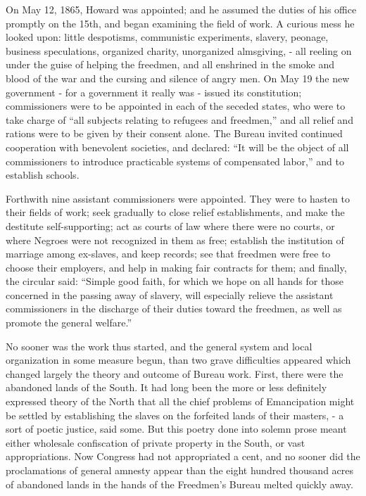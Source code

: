 On May 12, 1865, Howard was appointed; and he assumed the duties of his office promptly on the 15th, and began examining the field of work. A curious mess he looked upon: little despotisms, communistic experiments, slavery, peonage, business speculations, organized charity, unorganized almsgiving, - all reeling on under the guise of helping the freedmen, and all enshrined in the smoke and blood of the war and the cursing and silence of angry men. On May 19 the new government - for a government it really was - issued its constitution; commissioners were to be appointed in each of the seceded states, who were to take charge of “all subjects relating to refugees and freedmen,” and all relief and rations were to be given by their consent alone. The Bureau invited continued cooperation with benevolent societies, and declared: “It will be the object of all commissioners to introduce practicable systems of compensated labor,” and to establish schools.\par

Forthwith nine assistant commissioners were appointed. They were to hasten to their fields of work; seek gradually to close relief establishments, and make the destitute self-supporting; act as courts of law where there were no courts, or where Negroes were not recognized in them as free; establish the institution of marriage among ex-slaves, and keep records; see that freedmen were free to choose their employers, and help in making fair contracts for them; and finally, the circular said: “Simple good faith, for which we hope on all hands for those concerned in the passing away of slavery, will especially relieve the assistant commissioners in the discharge of their duties toward the freedmen, as well as promote the general welfare.”\par

No sooner was the work thus started, and the general system and local organization in some measure begun, than two grave difficulties appeared which changed largely the theory and outcome of Bureau work. First, there were the abandoned lands of the South. It had long been the more or less definitely expressed theory of the North that all the chief problems of Emancipation might be settled by establishing the slaves on the forfeited lands of their masters, - a sort of poetic justice, said some. But this poetry done into solemn prose meant either wholesale confiscation of private property in the South, or vast appropriations. Now Congress had not appropriated a cent, and no sooner did the proclamations of general amnesty appear than the eight hundred thousand acres of abandoned lands in the hands of the Freedmen’s Bureau melted quickly away.\par

